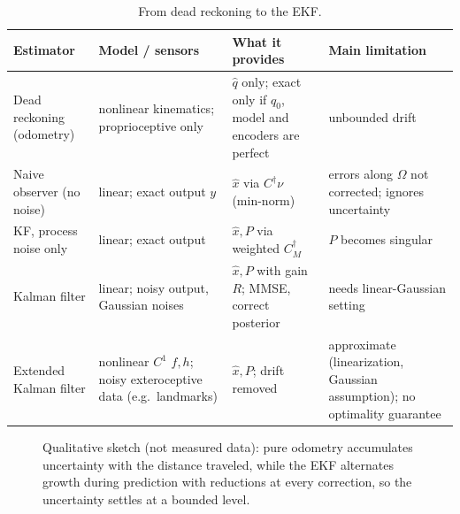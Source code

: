 \documentclass[11pt,a4paper]{article}
\def\boldsymbol#1{#1}%
\def\mathbf#1{#1}%
\newcommand{\pinv}{^{\dagger}}
\newcommand{\hx}{\hat{\boldsymbol{x}}}
\newcommand{\hq}{\hat{\boldsymbol{q}}}
\newcommand{\bq}{\boldsymbol{q}}
\newcommand{\by}{\boldsymbol{y}}
\newcommand{\bnu}{\boldsymbol{\nu}}
\newcommand{\mC}{\mathbf{C}}
\newcommand{\mP}{\mathbf{P}}
\newcommand{\mR}{\mathbf{R}}
\theoremstyle{definition}
\theoremstyle{plain}
\theoremstyle{remark}
\begin{document}
\begin{table}[htbp]
\centering
\small
\renewcommand{\arraystretch}{1.25}
\begin{tabularx}{\textwidth}{@{}>{\raggedright\arraybackslash}p{2.6cm}>{\raggedright\arraybackslash}X>{\raggedright\arraybackslash}X>{\raggedright\arraybackslash}X@{}}
\toprule
\textbf{Estimator} & \textbf{Model / sensors} & \textbf{What it provides} & \textbf{Main limitation}\\
\midrule
Dead reckoning (odometry) & nonlinear kinematics; proprioceptive only & $\hq$ only; exact only if $\bq_0$, model and encoders are perfect & unbounded drift\\
Naive observer (no noise) & linear; exact output $\by$ & $\hx$ via $\mC\pinv\bnu$ (min-norm) & errors along $\Omega$ not corrected; ignores uncertainty\\
KF, process noise only & linear; exact output & $\hx,\mP$ via weighted $\mC_M\pinv$ & $\mP$ becomes singular\\
Kalman filter & linear; noisy output, Gaussian noises & $\hx,\mP$ with gain $\mR$; MMSE, correct posterior & needs linear-Gaussian setting\\
Extended Kalman filter & nonlinear $C^1$ $\boldsymbol f,\boldsymbol h$; noisy exteroceptive data (e.g.\ landmarks) & $\hx,\mP$; drift removed & approximate (linearization, Gaussian assumption); no optimality guarantee\\
\bottomrule
\end{tabularx}
\caption{From dead reckoning to the EKF.}
\end{table}

\begin{figure}[H]
\centering
{}
\caption{Qualitative sketch (not measured data): pure odometry accumulates uncertainty with the distance traveled, while the EKF alternates
growth during prediction with reductions at every correction, so the uncertainty settles at a bounded level.}\label{fig:summary}
\end{figure}
\end{document}
